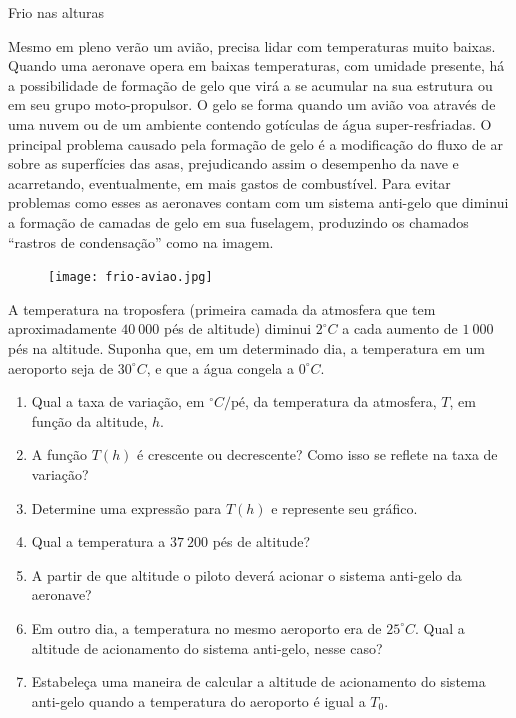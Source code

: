 \begin{task}{Frio nas alturas}
\label{\detokenize{AF107-6:atividade-frio-nas-alturas}}\label{\detokenize{AF107-6:id3}}

Mesmo em pleno verão um avião, precisa lidar com temperaturas muito baixas. Quando uma aeronave opera em baixas temperaturas, com umidade presente, há a possibilidade de formação de gelo que virá a se acumular na sua estrutura ou em seu grupo moto-propulsor. O gelo se forma quando um avião voa através de uma nuvem ou de um ambiente contendo gotículas de água super-resfriadas. O principal problema causado pela formação de gelo é a modificação do fluxo de ar sobre as superfícies das asas, prejudicando assim o desempenho da nave e acarretando, eventualmente, em mais gastos de combustível. Para evitar problemas como esses as aeronaves contam com um sistema anti-gelo que diminui a formação de camadas de gelo em sua fuselagem, produzindo os chamados “rastros de condensação” como na imagem.

\begin{figure}[H]
\centering

\noindent\texttt{[image: frio-aviao.jpg]}
\end{figure}

A temperatura na troposfera (primeira camada da atmosfera que tem aproximadamente \(40\ 000\) pés de altitude) diminui \(2^\circ C\) a cada aumento de \(1\ 000\) pés na altitude. Suponha que, em um determinado dia, a temperatura em um aeroporto seja de \(30^\circ C\), e que a água congela a \(0^\circ C\).
\begin{enumerate}
\item {} 
Qual a taxa de variação, em \(^\circ C/\text{pé}\), da temperatura da atmosfera, \(T\), em função da altitude, \(h\).

\item {} 
A função \(T(h)\) é crescente ou decrescente? Como isso se reflete na taxa de variação?

\item {} 
Determine uma expressão para \(T(h)\) e represente seu gráfico.

\item {} 
Qual a temperatura a \(37\ 200\) pés de altitude?

\item {} 
A partir de que altitude o piloto deverá acionar o sistema anti-gelo da aeronave?

\item {} 
Em outro dia, a temperatura no mesmo aeroporto era de \(25^\circ C\). Qual a altitude de acionamento do sistema anti-gelo, nesse caso?

\item {} 
Estabeleça uma maneira de calcular a altitude de acionamento do sistema anti-gelo quando a temperatura do aeroporto é igual a \(T_0\).

\end{enumerate}
\end{task}

